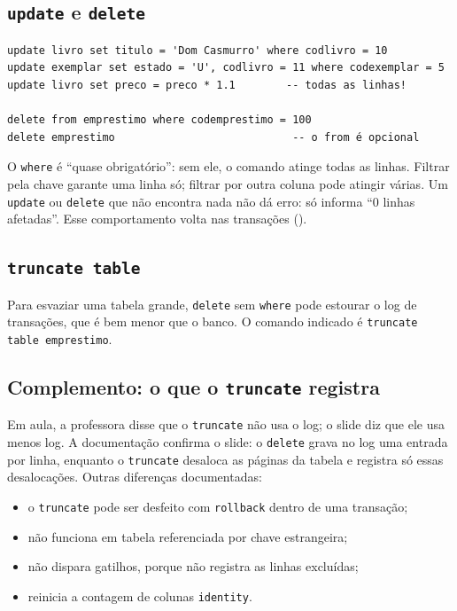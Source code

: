 \subsection{\texttt{update} e \texttt{delete}}

\begin{lstlisting}
update livro set titulo = 'Dom Casmurro' where codlivro = 10
update exemplar set estado = 'U', codlivro = 11 where codexemplar = 5
update livro set preco = preco * 1.1        -- todas as linhas!

delete from emprestimo where codemprestimo = 100
delete emprestimo                            -- o from é opcional
\end{lstlisting}

O \texttt{where} é ``quase obrigatório'': sem ele, o comando atinge todas
as linhas. Filtrar pela chave garante uma linha só; filtrar por outra
coluna pode atingir várias. Um \texttt{update} ou \texttt{delete} que não
encontra nada não dá erro: só informa ``0 linhas afetadas''. Esse
comportamento volta nas transações ().

\subsection{\texttt{truncate table}}

Para esvaziar uma tabela grande, \texttt{delete} sem \texttt{where} pode
estourar o log de transações, que é bem menor que o banco. O comando
indicado é \texttt{truncate table emprestimo}.

\subsection*{Complemento: o que o \texttt{truncate} registra}

Em aula, a professora disse que o \texttt{truncate} não usa o log; o
slide diz que ele usa menos log. A documentação
confirma o slide: o \texttt{delete} grava no log uma entrada por linha,
enquanto o \texttt{truncate} desaloca as páginas da tabela e registra só
essas desalocações. Outras diferenças documentadas:

\begin{itemize}
	\item o \texttt{truncate} pode ser desfeito com \texttt{rollback}
	dentro de uma transação;
	\item não funciona em tabela referenciada por chave estrangeira;
	\item não dispara gatilhos, porque não registra as linhas
	excluídas;
	\item reinicia a contagem de colunas \texttt{identity}.
\end{itemize}

